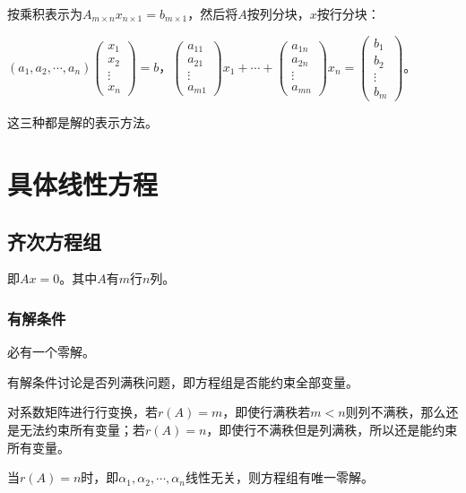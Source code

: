 \documentclass[UTF8, 12pt]{ctexart}
\begin{document}
按乘积表示为$A_{m\times n}x_{n\times 1}=b_{m\times 1}$，然后将$A$按列分块，$x$按行分块：\medskip

$(a_1,a_2,\cdots,a_n)\left(\begin{array}{c}
x_1 \\
x_2 \\
\vdots \\
x_n
\end{array}\right)=b\text{，}\left(\begin{array}{c}
a_{11} \\
a_{21} \\
\vdots \\
a_{m1}
\end{array}\right)x_1+\cdots+\left(\begin{array}{c}
a_{1n} \\
a_{2n} \\
\vdots \\
a_{mn}
\end{array}\right)x_n=\left(\begin{array}{c}
b_1 \\
b_2 \\
\vdots \\
b_m
\end{array}\right)\text{。}$

这三种都是解的表示方法。

\section{具体线性方程}

\subsection{齐次方程组}

即$Ax=0$。其中$A$有$m$行$n$列。

\subsubsection{有解条件}

必有一个零解。

有解条件讨论是否列满秩问题，即方程组是否能约束全部变量。

对系数矩阵进行行变换，若$r(A)=m$，即使行满秩若$m<n$则列不满秩，那么还是无法约束所有变量；若$r(A)=n$，即使行不满秩但是列满秩，所以还是能约束所有变量。

当$r(A)=n$时，即$\alpha_1,\alpha_2,\cdots,\alpha_n$线性无关，则方程组有唯一零解。
\end{document}
